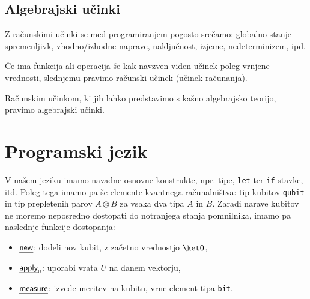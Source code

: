\subsection{Algebrajski učinki}

Z računskimi učinki se med programiranjem pogosto srečamo: globalno stanje spremenljivk, vhodno/izhodne naprave, naključnost, izjeme, nedeterminizem, ipd.

\begin{definition}
    Če ima funkcija ali operacija še kak navzven viden učinek poleg vrnjene vrednosti, slednjemu pravimo računski učinek (učinek računanja).
\end{definition}

\begin{definition}
    Računskim učinkom, ki jih lahko predstavimo s kašno algebrajsko teorijo, pravimo algebrajski učinki.
\end{definition}


\section{Programski jezik}

V našem jeziku\cite{algeff-lin-qpl} imamo navadne osnovne konstrukte,
npr. tipe, \texttt{let} ter \texttt{if} stavke, itd.
Poleg tega imamo pa še elemente kvantnega računalništva:
tip kubitov \texttt{qubit} in tip prepletenih parov \( A⊗B \) za vsaka dva tipa \(A\) in \(B\).
Zaradi narave kubitov ne moremo neposredno dostopati do notranjega stanja pomnilnika,
imamo pa naslednje funkcije dostopanja:
\begin{itemize}
    \item \(\eff{new}\): dodeli nov kubit, z začetno vrednostjo \(\ket 0\),
    \item \(\eff{apply}_{\g U}\): uporabi vrata \(U\) na danem vektorju,
    \item \(\eff{measure}\): izvede meritev na kubitu, vrne element tipa \texttt{bit}.
\end{itemize}

